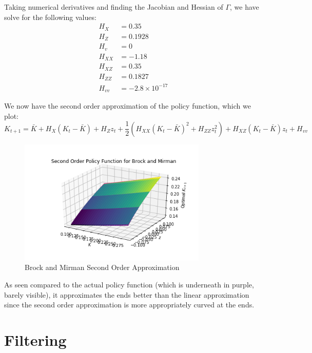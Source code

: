 \documentclass[letterpaper,11pt]{article}
\theoremstyle{definition}
\begin{document}
\begin{spacing}{1.5}
	\begin{Exercise} \label{Perturb_HW_BM}
		Taking numerical derivatives and finding the Jacobian and Hessian of $\Gamma$, we have solve for the following values:
		\begin{align*}
			H_X &= 0.35 \\
			H_Z &= 0.1928 \\
			H_v &= 0 \\
			H_{XX}&= -1.18 \\
			H_{XZ} &= 0.35 \\
			H_{ZZ}&= 0.1827 \\
			H_{vv}&= -2.8\times10^{-17}
		\end{align*}

		We now have the second order approximation of the policy function, which we plot:
		\begin{equation*}
			K_{t+1}=\bar{K}+H_X(K_t-\bar{K})+H_Zz_t+\frac{1}{2}(H_{XX}(K_t-\bar{K})^2+H_{ZZ}z_t^2)+H_{XZ}(K_t-\bar{K})z_t+H_{vv}
		\end{equation*}

		\begin{figure}[H]
			\caption{Brock and Mirman Second Order Approximation}
			\label{fig:BM_stochastic_second}
			\includegraphics[width=0.8\textwidth]{Brock_and_Merman_second_order_policy.png}
		\end{figure}

		As seen compared to the actual policy function (which is underneath in purple, barely visible), it approximates the ends better than the linear approximation since the second order approximation is more appropriately curved at the ends.
	\end{Exercise}

\section*{Filtering}\label{Filter_HW}
\setcounter{Exercise}{2}


\end{spacing}
\end{document}
